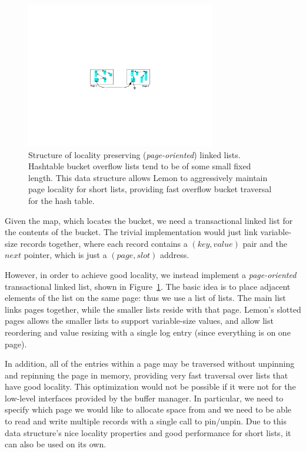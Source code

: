 \documentclass[10pt,letterpaper,twocolumn,english]{article}
\newcommand{\yad}{Lemon\xspace}
\begin{document}
\begin{figure}
\hspace{.25in}
\includegraphics[width=3.25in]{LHT2.pdf}
\caption{\sf \label{fig:LHT}Structure of locality preserving ({\em page-oriented}) 
linked lists.  Hashtable bucket overflow lists tend to be of some small fixed 
length.  This data structure allows \yad to aggressively maintain page locality 
for short lists, providing fast overflow bucket traversal for the hash table.}
\end{figure}

Given the map, which locates the bucket, we need a transactional
linked list for the contents of the bucket.  The trivial implementation
would just link variable-size records together, where each record
contains a $(key,value)$ pair and the $next$ pointer, which is just a
$(page,slot)$ address.

However, in order to achieve good locality, we instead implement a
{\em page-oriented} transactional linked list, shown in
Figure~\ref{fig:LHT}.  The basic idea is to place adjacent elements of
the list on the same page: thus we use a list of lists. The main list
links pages together, while the smaller lists reside with that
page. \yad's slotted pages allows the smaller lists to support
variable-size values, and allow list reordering and value resizing
with a single log entry (since everything is on one page).

In addition, all of the entries within a page may be traversed without
unpinning and repinning the page in memory, providing very fast
traversal over lists that have good locality.  This optimization would
not be possible if it were not for the low-level interfaces provided
by the buffer manager.  In particular, we need to specify which page 
we would like to allocate space from and we need to be able to
read and write multiple records with a single call to pin/unpin.  Due to
this data structure's nice locality properties and good performance
for short lists, it can also be used on its own.
\end{document}
